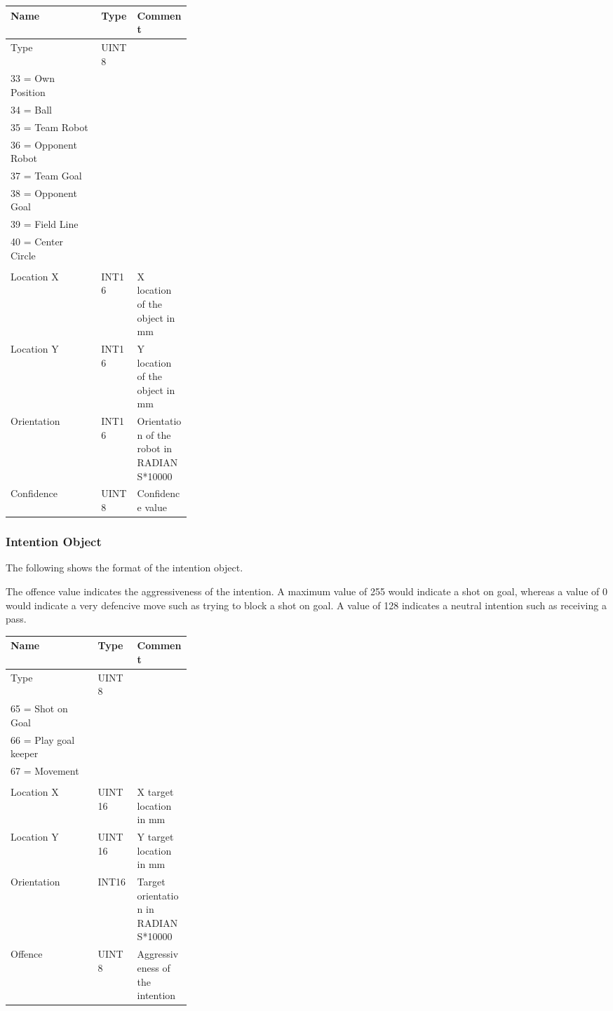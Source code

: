 \documentclass[12pt]{hurocup}
\begin{document}
\begin{center}
\begin{tabular}[t]{|l|l|p{0.3\linewidth}|}
  \hline
  Name & Type & Comment \\
  \hline
  Type          & UINT8 & 
  \begin{minipage}[t]{\linewidth}
    32 = UNDEFINED\\
    33 = Own Position\\
    34 = Ball\\
    35 = Team Robot \\
    36 = Opponent Robot\\
    37 = Team Goal\\
    38 = Opponent Goal\\
    39 = Field Line\\
    40 = Center Circle\\
  \end{minipage}\\
  Location X & INT16 & X location of the object in mm\\
  Location Y & INT16 & Y location of the object in mm\\
  Orientation & INT16 & Orientation of the robot in RADIANS*10000\\
  Confidence & UINT8 & Confidence value\\
  \hline
\end{tabular}
\end{center}

\subsubsection*{Intention Object}

The following shows the format of the intention object.

The offence value indicates the aggressiveness of the intention. A
maximum value of 255 would indicate a shot on goal, whereas a value of
0 would indicate a very defencive move such as trying to block a shot
on goal. A value of 128 indicates a neutral intention such as
receiving a pass.

\begin{center}
\begin{tabular}[t]{|l|l|p{0.3\linewidth}|}
  \hline
  Name & Type & Comment \\
  \hline
  Type          & UINT8 & 
  \begin{minipage}[t]{\linewidth}
    64 = UNDEFINED\\
    65 = Shot on Goal\\
    66 = Play goal keeper\\
    67 = Movement\\
  \end{minipage}\\
  Location X & UINT16 & X target location in mm\\
  Location Y & UINT16 & Y target location in mm\\
  Orientation & INT16 & Target orientation in RADIANS*10000\\
  Offence & UINT8 & Aggressiveness of the intention\\
  \hline
\end{tabular}
\end{center}
\end{document}
